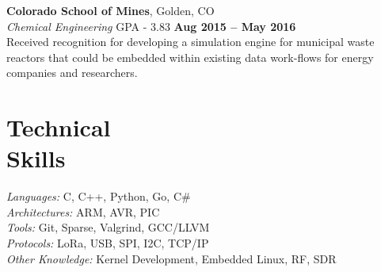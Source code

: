 \documentclass[margin,line]{resume}
\begin{document}
\begin{resume}
    \textbf{Colorado School of Mines}, Golden, CO \vspace{2mm}\\\vspace{1mm}%
    \textsl{Chemical Engineering} GPA - 3.83 \hfill \textbf{Aug 2015 -- May 2016}\\
    Received recognition for developing a simulation engine for municipal waste
    reactors that could be embedded within existing data work-flows for energy
    companies and researchers.

    \section{\mysidestyle Technical\\Skills}

    \emph{Languages:} C, C++, Python, Go, C\#\\
    \emph{Architectures:} ARM, AVR, PIC\\
    \emph{Tools:} Git, Sparse, Valgrind, GCC/LLVM\\
    \emph{Protocols:} LoRa, USB, SPI, I2C, TCP/IP\\
    \emph{Other Knowledge:} Kernel Development, Embedded Linux, RF, SDR\\
\end{resume}
\end{document}

